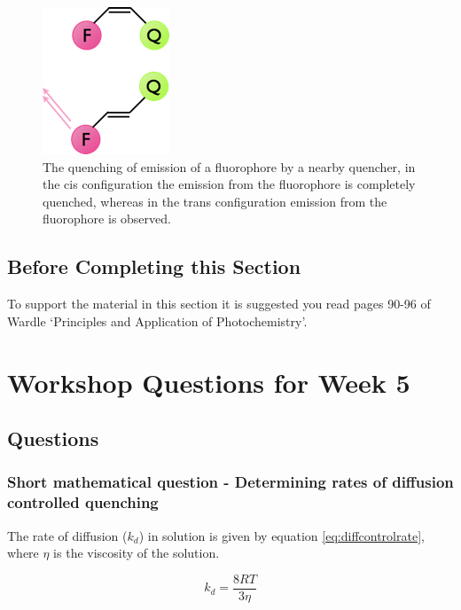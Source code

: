 \documentclass[
]{book}
\begin{document}
\begin{figure}

{\centering \includegraphics[width=0.2\linewidth]{images/cisquench} 

}

\caption{The quenching of emission of a fluorophore by a nearby quencher, in the cis configuration the emission from the fluorophore is completely quenched, whereas in the trans configuration emission from the fluorophore is observed.}\label{fig:cisquench}
\end{figure}

\hypertarget{before-completing-this-section-2}{%
\section{Before Completing this Section}\label{before-completing-this-section-2}}

To support the material in this section it is suggested you read pages 90-96 of Wardle `Principles and Application of Photochemistry'.

\hypertarget{ch:Workshop4}{%
\chapter{Workshop Questions for Week 5}\label{ch:Workshop4}}

\hypertarget{questions-1}{%
\section{Questions}\label{questions-1}}

\hypertarget{sec:diffcontrol}{%
\subsection{Short mathematical question - Determining rates of diffusion controlled quenching}\label{sec:diffcontrol}}

The rate of diffusion (\(k_d\)) in solution is given by equation \eqref{eq:diffcontrolrate}, where \(\eta\) is the viscosity of the solution.

\begin{equation}
k_d = \frac{8RT}{3 \eta}
\label{eq:diffcontrolrate}
\end{equation}
\end{document}

